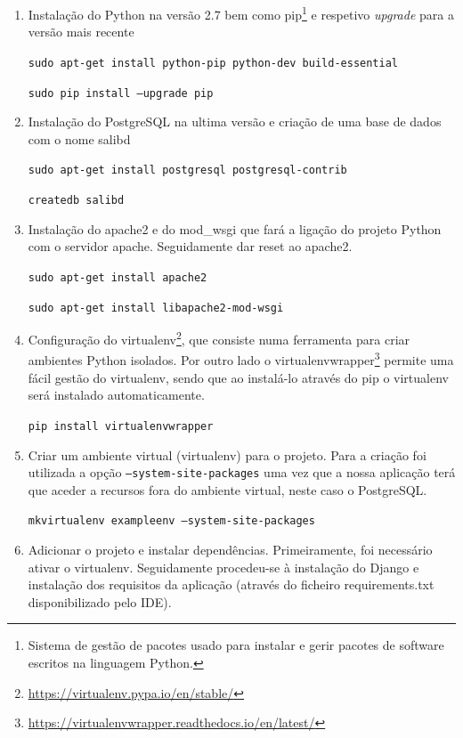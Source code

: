 \begin{enumerate}
	\item Instalação do Python na versão 2.7 bem como pip\footnote{Sistema de gestão de pacotes usado para instalar e gerir pacotes de software escritos na linguagem Python.} e respetivo \textit{upgrade} para a versão mais recente
	
	\texttt{sudo apt-get install python-pip python-dev build-essential}
	
	\texttt{sudo pip install --upgrade pip}
	
	
	\item Instalação do PostgreSQL na ultima versão e criação de uma base de dados com o nome salibd
	
	
	\texttt{sudo apt-get install postgresql postgresql-contrib}

	\texttt{createdb salibd}	
	
	
	\item Instalação do apache2 e do mod\_wsgi que fará a ligação do projeto Python com o servidor apache. Seguidamente dar reset ao apache2.
	
	\texttt{sudo apt-get install apache2}
	
	\texttt{sudo apt-get install libapache2-mod-wsgi}
	
	
	\item Configuração do virtualenv\footnote{\url{https://virtualenv.pypa.io/en/stable/}}, que consiste numa ferramenta para criar ambientes Python isolados. Por outro lado o virtualenvwrapper\footnote{\url{https://virtualenvwrapper.readthedocs.io/en/latest/}} permite uma fácil gestão do virtualenv, sendo que ao instalá-lo através do pip o virtualenv será instalado automaticamente. 
	
	
	\texttt{pip install virtualenvwrapper}
	
	 
	\item Criar um ambiente virtual (virtualenv) para o projeto. Para a criação foi utilizada a opção \texttt{--system-site-packages} uma vez que a nossa aplicação terá que aceder a recursos fora do ambiente virtual, neste caso o PostgreSQL. 
	
	\texttt{mkvirtualenv exampleenv --system-site-packages}
	
	
	\item Adicionar o projeto e instalar dependências. Primeiramente, foi necessário ativar o virtualenv. Seguidamente procedeu-se à instalação do Django e instalação dos requisitos da aplicação (através do ficheiro requirements.txt disponibilizado pelo IDE). 
	

\end{enumerate}

